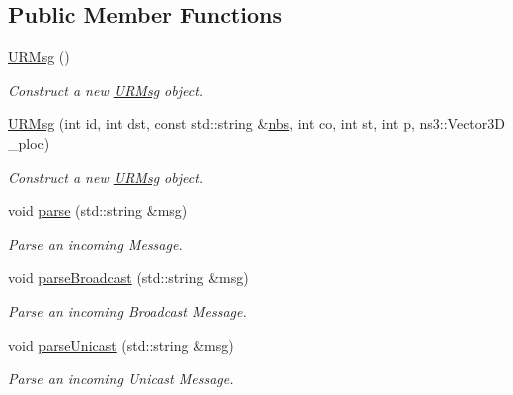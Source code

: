 \subsection*{Public Member Functions}
\begin{DoxyCompactItemize}
\item 
\mbox{\label{structrnl_1_1URMsg_ac024bb5b8c3f25ce8ffd002936aac4f3}} 
\hyperlink{structrnl_1_1URMsg_ac024bb5b8c3f25ce8ffd002936aac4f3}{U\+R\+Msg} ()
\begin{DoxyCompactList}\small\item\em Construct a new \hyperlink{structrnl_1_1URMsg}{U\+R\+Msg} object. \end{DoxyCompactList}\item 
\hyperlink{structrnl_1_1URMsg_ad0a50a86d814c753643669cbd2b0cdea}{U\+R\+Msg} (int id, int dst, const std\+::string \&\hyperlink{structrnl_1_1URMsg_a464d0a68407e00b860a9c3f89ae9bb0f}{nbs}, int co, int st, int p, ns3\+::\+Vector3D \+\_\+ploc)
\begin{DoxyCompactList}\small\item\em Construct a new \hyperlink{structrnl_1_1URMsg}{U\+R\+Msg} object. \end{DoxyCompactList}\item 
void \hyperlink{structrnl_1_1URMsg_ad4e437f591cc835f57224e4a0dd26000}{parse} (std\+::string \&msg)
\begin{DoxyCompactList}\small\item\em Parse an incoming Message. \end{DoxyCompactList}\item 
void \hyperlink{structrnl_1_1URMsg_a55d798b7ca94d8b9ab07dadad8331311}{parse\+Broadcast} (std\+::string \&msg)
\begin{DoxyCompactList}\small\item\em Parse an incoming Broadcast Message. \end{DoxyCompactList}\item 
void \hyperlink{structrnl_1_1URMsg_a63005142e2e44009d27f3a5a131b2947}{parse\+Unicast} (std\+::string \&msg)
\begin{DoxyCompactList}\small\item\em Parse an incoming Unicast Message. \end{DoxyCompactList}\end{DoxyCompactItemize}
